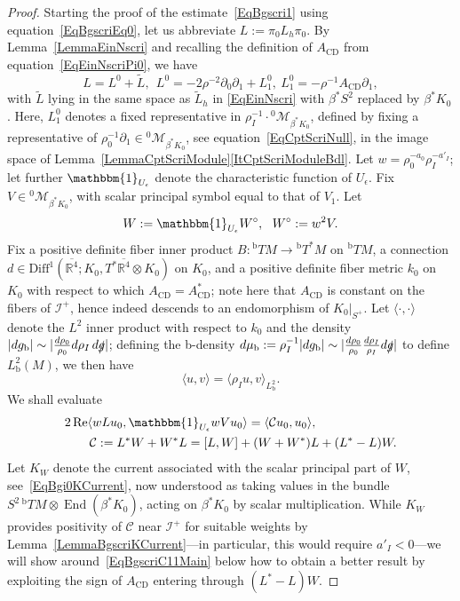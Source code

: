 \documentclass[reqno,11pt,letterpaper]{amsart}
\numberwithin{equation}{section}
\numberwithin{figure}{section}
\theoremstyle{definition}
\theoremstyle{remark}
\newcommand{\mc}{\mathcal}
\newcommand{\cC}{\mc C}
\newcommand{\cM}{\mc M}
\newcommand{\ms}{\mathscr}
\newcommand{\scri}{\ms I}
\newcommand{\R}{\mathbb{R}}
\newcommand{\one}{\mathbbm{1}}
\newcommand{\slg}{\slashed{g}{}}
\newcommand{\End}{\operatorname{End}}
\renewcommand{\Re}{\operatorname{Re}}
\newcommand{\CD}{{\mathrm{CD}}}
\newcommand{\eps}{\epsilon}
\newcommand{\la}{\langle}
\newcommand{\ol}{\overline}
\newcommand{\pa}{\partial}
\newcommand{\ra}{\rangle}
\newcommand{\wt}{\widetilde}
\newcommand{\bop}{{\mathrm{b}}}
\newcommand{\Diff}{\mathrm{Diff}}
\newcommand{\Tb}{{}^{\bop}T}
\begin{document}
\begin{proof}
  Starting the proof of the estimate~\eqref{EqBgscri1} using equation~\eqref{EqBgscriEq0}, let us abbreviate $L:=\pi_0 L_h\pi_0$. By Lemma~\ref{LemmaEinNscri} and recalling the definition of $A_\CD$ from equation~\eqref{EqEinNscriPi0}, we have
  \begin{equation}
  \label{EqBgscriLpi0}
    L = L^0 + \wt L,\ \ L^0 = -2\rho^{-2}\pa_0\pa_1 + L^0_1,\ L^0_1=-\rho^{-1}A_\CD\pa_1,
  \end{equation}
  with $\wt L$ lying in the same space as $\wt L_h$ in \eqref{EqEinNscri} with $\beta^*S^2$ replaced by $\beta^*K_0$. Here, $L^0_1$ denotes a fixed representative in $\rho_I^{-1}\cdot{}^0\cM_{\beta^*K_0}$, defined by fixing a representative of $\rho_0^{-1}\pa_1\in {}^0\cM_{\beta^*K_0}$, see equation~\eqref{EqCptScriNull}, in the image space of Lemma~\ref{LemmaCptScriModule}\eqref{ItCptScriModuleBdl}. Let $w=\rho_0^{-a_0}\rho_I^{-a'_I}$; let further $\one_{U_\eps}$ denote the characteristic function of $U_\eps$. Fix $V\in{}^0\cM_{\beta^*K_0}$, with scalar principal symbol equal to that of $V_1$. Let
  \[
    W:=\one_{U_\eps}W^\circ,\ \ W^\circ:=w^2 V.
  \]
  Fix a positive definite fiber inner product $B\colon\Tb M\to\Tb^*M$ on $\Tb M$, a connection $d\in\Diff^1(\ol{\R^4};K_0,T^*\ol{\R^4}\otimes K_0)$ on $K_0$, and a positive definite fiber metric $k_0$ on $K_0$ with respect to which $A_\CD=A_\CD^*$; note here that $A_\CD$ is constant on the fibers of $\scri^+$, hence indeed descends to an endomorphism of $K_0|_{S^+}$. Let $\la\cdot,\cdot\ra$ denote the $L^2$ inner product with respect to $k_0$ and the density $|d g_\bop|\sim|\frac{d\rho_0}{\rho_0}d\rho_I\,d\slg|$; defining the b-density $d\mu_\bop:=\rho_I^{-1}|d g_\bop|\sim|\frac{d\rho_0}{\rho_0}\frac{d\rho_I}{\rho_I}d\slg|$ to define $L^2_\bop(M)$, we then have
  \begin{equation}
  \label{EqBgscriL2Relation}
    \la u,v\ra = \la \rho_I u,v\ra_{L^2_\bop}.
  \end{equation}
  We shall evaluate
  \begin{equation}
  \label{EqBgscriPairing}
  \begin{split}
    &2\Re\la w L u_0, \one_{U_\eps}w V u_0\ra = \la \cC u_0, u_0\ra, \\
    &\qquad \cC := L^*W+W^*L = [L,W]+(W+W^*)L+(L^*-L)W.
  \end{split}
  \end{equation}
  Let $K_W$ denote the current associated with the scalar principal part of $W$, see~\eqref{EqBgi0KCurrent}, now understood as taking values in the bundle $S^2\,\Tb M\otimes\End(\beta^*K_0)$, acting on $\beta^*K_0$ by scalar multiplication. While $K_W$ provides positivity of $\cC$ near $\scri^+$ for suitable weights by Lemma~\ref{LemmaBgscriKCurrent}---in particular, this would require $a'_I<0$---we will show around~\eqref{EqBgscriC11Main} below how to obtain a better result by exploiting the sign of $A_\CD$ entering through $(L^*-L)W$.


\end{proof}
\end{document}
